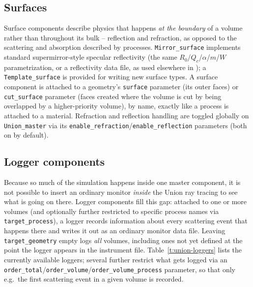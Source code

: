 \subsection{Surfaces}
\label{sec:union-surfaces}

Surface components describe physics that happens \emph{at the boundary} of
a volume rather than throughout its bulk -- reflection and refraction, as
opposed to the scattering and absorption described by processes.
\texttt{Mirror\_surface} implements standard supermirror-style specular
reflectivity (the same $R_0$/$Q_c$/$\alpha$/$m$/$W$ parametrization, or a
reflectivity data file, as used elsewhere in \MCS); a
\texttt{Template\_surface} is provided for writing new surface types. A
surface component is attached to a geometry's \texttt{surface} parameter
(its outer faces) or \texttt{cut\_surface} parameter (faces created where
the volume is cut by being overlapped by a higher-priority volume), by
name, exactly like a process is attached to a material. Refraction and
reflection handling are toggled globally on \texttt{Union\_master} via its
\texttt{enable\_refraction}/\texttt{enable\_reflection} parameters (both on
by default).

\subsection{Logger components}
\label{sec:union-loggers}

Because so much of the simulation happens inside one master component, it
is not possible to insert an ordinary \MCS monitor \emph{inside} the Union
ray tracing to see what is going on there. Logger components fill this gap:
attached to one or more volumes (and optionally further restricted to
specific process names via \texttt{target\_process}), a logger records
information about every scattering event that happens there and writes it
out as an ordinary \MCS monitor data file. Leaving \texttt{target\_geometry}
empty logs \emph{all} volumes, including ones not yet defined at the point
the logger appears in the instrument file. Table~\ref{t:union-loggers} lists
the currently available loggers; several further restrict what gets logged
via an \texttt{order\_total}/\texttt{order\_volume}/\texttt{order\_volume\_process}
parameter, so that only e.g.\ the first scattering event in a given volume
is recorded.

